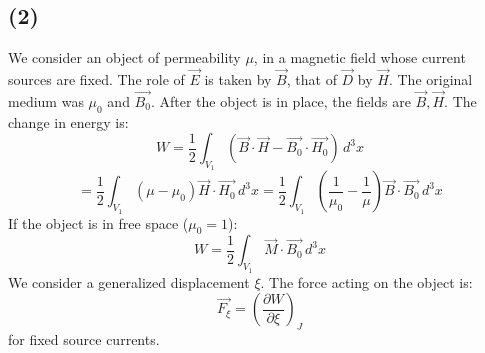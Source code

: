 \documentclass{article}
\begin{document}
	\subsection*{(2)}
	We consider an object of permeability $\mu$, in a magnetic field whose current sources are fixed. The role of $\vec{E}$ is taken by $\vec{B}$, that of $\vec{D}$ by $\vec{H}$. The original medium was $\mu_0$ and $\vec{B_0}$. After the object is in place, the fields are $\vec{B}, \vec{H}$. The change in energy is:
	$$ W = \frac{1}{2} \int_{V_1} (\vec{B} \cdot \vec{H} - \vec{B_0} \cdot \vec{H_0}) \, d^3x $$
	$$ = \frac{1}{2} \int_{V_1} (\mu - \mu_0) \vec{H} \cdot \vec{H_0} \, d^3x = \frac{1}{2} \int_{V_1} (\frac{1}{\mu_0} - \frac{1}{\mu}) \vec{B} \cdot \vec{B_0} \, d^3x $$
	If the object is in free space ($\mu_0=1$):
	$$ W = \frac{1}{2} \int_{V_1} \vec{M} \cdot \vec{B_0} \, d^3x $$
	We consider a generalized displacement $\xi$. The force acting on the object is:
	$$ \vec{F_\xi} = \left( \frac{\partial W}{\partial \xi} \right)_J $$
	for fixed source currents.
\end{document}
